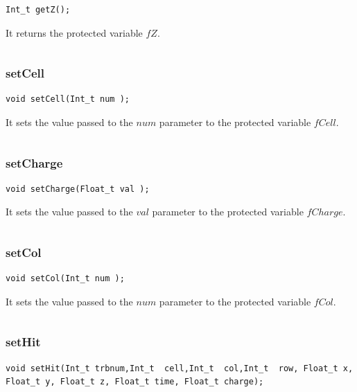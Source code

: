 \documentclass[a4paper]{book}
\begin{document}
\begin{lstlisting}[style=customc]
Int_t getZ();
\end{lstlisting}

It returns the protected variable $fZ$.

\[\]

\subsubsection{setCell}

\begin{lstlisting}[style=customc]
void setCell(Int_t num );
\end{lstlisting}

It sets the value passed to the $num$ parameter to the protected variable $fCell$.

\[\]

\subsubsection{setCharge}

\begin{lstlisting}[style=customc]
void setCharge(Float_t val );
\end{lstlisting}

It sets the value passed to the $val$ parameter to the protected variable $fCharge$.

\[\]

\subsubsection{setCol}

\begin{lstlisting}[style=customc]
void setCol(Int_t num );
\end{lstlisting}

It sets the value passed to the $num$ parameter to the protected variable $fCol$.

\[\]

\subsubsection{setHit}

\begin{lstlisting}[style=customc]
void setHit(Int_t trbnum,Int_t  cell,Int_t  col,Int_t  row, Float_t x, Float_t y, Float_t z, Float_t time, Float_t charge);
\end{lstlisting}
\end{document}
